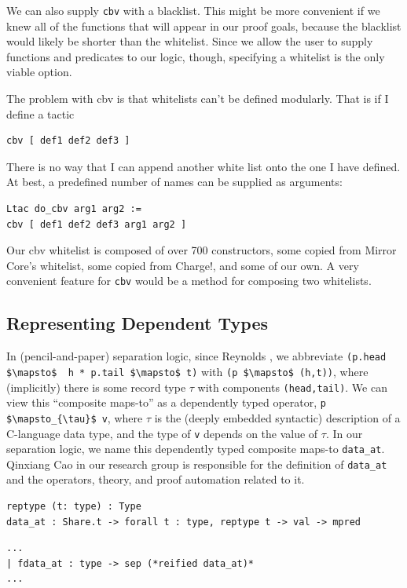 \documentclass{puthesis}
\begin{document}
We can also supply \lstinline|cbv| with a blacklist. This might be
more convenient if we knew all of the functions that will appear in
our proof goals, because the blacklist would likely be shorter than
the whitelist. Since we allow the user to supply functions and
predicates to our logic, though, specifying a whitelist is the only
viable option.

The problem with cbv is that whitelists can't be defined
modularly. That is if I define a tactic 

\begin{lstlisting}
cbv [ def1 def2 def3 ]
\end{lstlisting}

There is no way that I can append another white list onto the one I have
defined. At best, a predefined number of names can be supplied as
arguments:

\begin{lstlisting}
Ltac do_cbv arg1 arg2 :=
cbv [ def1 def2 def3 arg1 arg2 ]
\end{lstlisting}

Our cbv whitelist is composed of over 700 constructors, some
copied from Mirror Core's whitelist, some copied from Charge!, and
some of our own. A very convenient feature for \lstinline|cbv| would
be a method for composing two whitelists.

\subsection{Representing Dependent Types}
\label{sub:dependent}


In (pencil-and-paper) separation logic, since Reynolds
\cite{reynolds02}, we abbreviate 
\lstinline|(p.head $\mapsto$  h * p.tail $\mapsto$ t)| with 
\lstinline|(p $\mapsto$ (h,t))|, where (implicitly) there is some record type $\tau$ with
components \lstinline|(head,tail)|.  We can view this ``composite maps-to'' as a
dependently typed operator, \lstinline|p $\mapsto_{\tau}$ v|, where $\tau$ is the (deeply
embedded syntactic) description of a C-language data type, and the
type of \lstinline|v| depends on the value of $\tau$.  In our separation logic, we
name this dependently typed composite maps-to
\lstinline|data_at|. Qinxiang Cao in our research group is responsible
for the definition of \lstinline|data_at| and the operators, theory, and proof automation related to it.

\begin{lstlisting}
reptype (t: type) : Type
data_at : Share.t -> forall t : type, reptype t -> val -> mpred
\end{lstlisting}
\begin{lstlisting}
...
| fdata_at : type -> sep (*reified data_at)*
...
\end{lstlisting}
\end{document}
